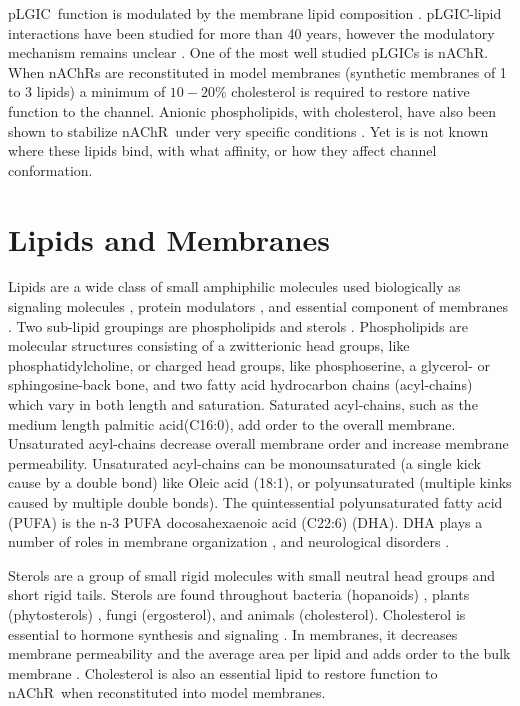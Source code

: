 \documentclass[12pt]{ruthesis_nofloat}
\newcommand{\nachr}{nAChR}
\newcommand{\plgic}{pLGIC}
\begin{document}
\plgic~function is modulated by the membrane lipid composition \citep{Salari2014,Corradi2018,Cheng2018}. \plgic-lipid interactions have been studied for more than 40 years, however the modulatory mechanism remains unclear \citep{Epstein1978,SCHIEBLER1978,Dalziel1980,Sunshine1994,Chen2007,Sogaard2006,Salari2014,Laverty2017,Cordero-Morales2018}.  One of the most well studied \plgic s is \nachr. When \nachr s are reconstituted in model membranes (synthetic membranes of 1 to 3 lipids) a minimum of $10-20\%$ cholesterol is required to restore native function to the channel. Anionic phospholipids, with cholesterol,  have also been shown to stabilize \nachr~under very specific conditions \citep{Ellena1983,Fong1986,Fong1987,Jones1988,Sunshine1994,DaCosta2009b,Hamouda2006a,DaCosta2004}. Yet is is not known where these lipids bind, with what affinity, or how they affect channel conformation. %

\section{Lipids and Membranes}

Lipids are a wide class of small amphiphilic molecules used biologically as signaling molecules \citep{Guesnet2011,Sezgin2012}, protein modulators \citep{Dacosta2013,Nemecz2016}, and essential component of membranes \cite{yeagle2016}. Two sub-lipid groupings are phospholipids and sterols  \citep{Burger2000,Simons2000,Shevchenko2010,buehler2016,yeagle2016}. Phospholipids are molecular structures consisting of a zwitterionic head groups, like phosphatidylcholine, or charged head groups, like phosphoserine, a glycerol- or sphingosine-back bone, and two fatty acid hydrocarbon chains (acyl-chains) which vary in both length and saturation. Saturated acyl-chains, such as the medium length palmitic acid(C16:0), add order to the overall membrane. Unsaturated  acyl-chains  decrease overall membrane order and increase membrane permeability. Unsaturated acyl-chains can be monounsaturated (a single kick cause by a double bond) like Oleic acid (18:1), or polyunsaturated (multiple kinks caused by multiple double bonds). The quintessential polyunsaturated fatty acid (PUFA) is the n-3 PUFA docosahexaenoic acid (C22:6) (DHA). DHA plays a number of roles in membrane organization \citep{Stillwell2003a,Gawrisch2003}, and neurological disorders \citep{Guesnet2011,DeFelice2012,Manor2011,McNamara2008}.

Sterols are a group of small rigid molecules with small neutral head groups and short rigid tails. Sterols are found throughout bacteria (hopanoids) \citep{Ourisson1992}, plants (phytosterols) \citep{Mlayeh2010}, fungi (ergosterol)\citep{Schneiter1999}, and animals (cholesterol). Cholesterol is essential to hormone synthesis and signaling \cite{buehler2016}. In membranes, it decreases membrane permeability and the average area per lipid and adds order to the bulk membrane \citep{YeagleCH9}. Cholesterol is also an essential lipid to restore function to \nachr~when reconstituted into model membranes.  
\end{document}
